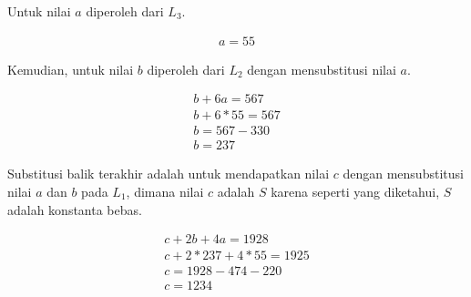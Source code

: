 Untuk nilai \begin{math}a\end{math} diperoleh dari \begin{math}L_3\end{math}.
\begin{center}
	\begin{gather}
		a = 55
	\end{gather}
\end{center}

\begin{flushleft}
	Kemudian, untuk nilai \begin{math}b\end{math} diperoleh dari \begin{math}L_2\end{math} dengan mensubstitusi nilai \begin{math}a\end{math}.
\end{flushleft}

\begin{center}
	\begin{gather}
		b + 6a = 567 \\
		b + 6*55 = 567 \\
		b = 567 - 330 \\
		b = 237
	\end{gather}
\end{center}

\begin{flushleft}
	Substitusi balik terakhir adalah untuk mendapatkan nilai \begin{math}c\end{math} dengan mensubstitusi nilai \begin{math}a\end{math} dan \begin{math}b\end{math} pada \begin{math}L_1\end{math}, dimana nilai \begin{math}c\end{math} adalah \begin{math}S\end{math} karena seperti yang diketahui, \begin{math}S\end{math} adalah konstanta bebas.
\end{flushleft}

\begin{center}
	\begin{gather}
		c + 2b + 4a = 1928 \\
		c + 2*237 + 4*55 = 1925 \\
		c = 1928 - 474 - 220 \\
		c = 1234
	\end{gather}
\end{center}

